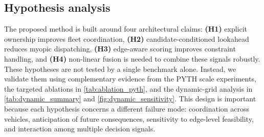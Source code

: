 \documentclass[conference]{IEEEtran}
\begin{document}
\begin{table}[t]
\centering
\caption{Ablation results on PYTH datasets. Values are mean normalized cost $\pm$ standard deviation.}
\label{tab:ablation_pyth}
\scriptsize
{}
\end{table}

\subsection{Hypothesis analysis}

The proposed method is built around four architectural claims: \textbf{(H1)} explicit ownership improves fleet coordination, \textbf{(H2)} candidate-conditioned lookahead reduces myopic dispatching, \textbf{(H3)} edge-aware scoring improves constraint handling, and \textbf{(H4)} non-linear fusion is needed to combine these signals robustly. These hypotheses are not tested by a single benchmark alone. Instead, we validate them using complementary evidence from the PYTH scale experiments, the targeted ablations in \autoref{tab:ablation_pyth}, and the dynamic-grid analysis in \autoref{tab:dynamic_summary} and \autoref{fig:dynamic_sensitivity}. This design is important because each hypothesis concerns a different failure mode: coordination across vehicles, anticipation of future consequences, sensitivity to edge-level feasibility, and interaction among multiple decision signals.
\end{document}
